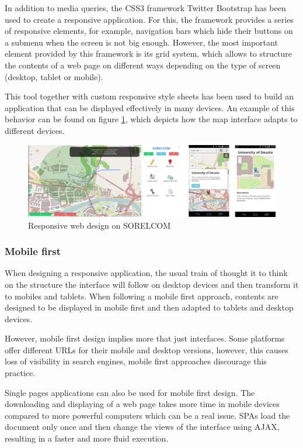 In addition to media queries, the CSS3 framework Twitter Bootstrap \cite{twitterbootstrap} has been used to create a responsive application. For this, the framework provides a series of responsive elements, for example, navigation bars which hide their buttons on a submenu when the screen is not big enough. However, the most important element provided by this framework is its grid system, which allows to structure the contents of a web page on different ways depending on the type of screen (desktop, tablet or mobile).

This tool together with custom responsive style sheets has been used to build an application that can be displayed effectively in many devices. An example of this behavior can be found on figure \ref{fig:responsive}, which depicts how the map interface adapts to different devices.

\begin{figure}[ht]
  \centering
  \includegraphics[width=.8\textwidth]{fig/responsive-example}
  \caption{Responsive web design on SORELCOM}
  \label{fig:responsive}
\end{figure} 

\subsubsection{Mobile first}

When designing a responsive application, the usual train of thought it to think on the structure the interface will follow on desktop devices and then transform it to mobiles and tablets. When following a mobile first approach, contents are designed to be displayed in mobile first and then adapted to tablets and desktop devices.

However, mobile first design implies more that just interfaces. Some platforms offer different URLs for their mobile and desktop versions, however, this causes loss of visibility in search engines, mobile first approaches discourage this practice. 

Single pages applications can also be used for mobile first design. The downloading and displaying of a web page takes more time in mobile devices compared to more powerful computers which can be a real issue. SPAs load the document only once and then change the views of the interface using AJAX, resulting in a faster and more fluid execution.

